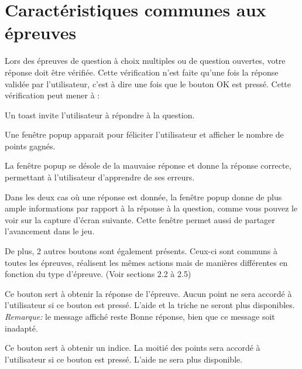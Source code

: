 \documentclass[11pt]{scrreprt}
\begin{document}
    \section{Caractéristiques communes aux épreuves}
    Lors des épreuves de question à choix multiples ou de question ouvertes, votre réponse doit être vérifiée. Cette vérification n'est faite qu'une fois la réponse validée par l'utilisateur, c'est à dire une fois que le bouton OK est pressé. Cette vérification peut mener à :
    \begin{description}[style=nextline]
        \item[Pas de réponse donnée]Un toast invite l'utilisateur à répondre à la question.
        \item[Réponse correcte]Une fenêtre popup apparait pour féliciter l'utilisateur et afficher le nombre de points gagnés.
        \item[Réponse incorrecte]La fenêtre popup se désole de la mauvaise réponse et donne la réponse correcte, permettant à l'utilisateur d'apprendre de ses erreurs.
    \end{description}
    Dans les deux cas où une réponse est donnée, la fenêtre popup donne de plus ample informations par rapport à la réponse à la question, comme vous pouvez le voir sur la capture d'écran suivante. Cette fenêtre permet aussi de partager l'avancement dans le jeu.

    De plus, 2 autres boutons sont également présents. Ceux-ci sont communs à toutes les épreuves, réalisent les mêmes actions mais de manières différentes en fonction du type d'épreuve. (Voir sections 2.2 à 2.5)
    \begin{description}[style=nextline]
        \item[Bouton de triche]Ce bouton sert à obtenir la réponse de l'épreuve. Aucun point ne sera accordé à l'utilisateur si ce bouton est pressé. L'aide et la triche ne seront plus disponibles. \textit{Remarque: } le message affiché reste \og Bonne réponse\fg, bien que ce message soit inadapté.
        \item[Bouton d'aide]Ce bouton sert à obtenir un indice. La moitié des points sera accordé à l'utilisateur si ce bouton est pressé. L'aide ne sera plus disponible.
    \end{description}
\end{document}
